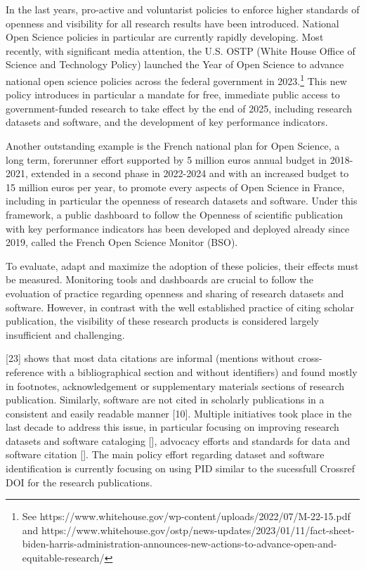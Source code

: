 \documentclass[
]{article}
\begin{document}
In the last years, pro-active and voluntarist policies to enforce higher
standards of openness and visibility for all research results have been
introduced. National Open Science policies in particular are currently
rapidly developing. Most recently, with significant media attention, the
U.S. OSTP (White House Office of Science and Technology Policy) launched
the Year of Open Science to advance national open science policies
across the federal government in 2023.\footnote{See
  https://www.whitehouse.gov/wp-content/uploads/2022/07/M-22-15.pdf and
  https://www.whitehouse.gov/ostp/news-updates/2023/01/11/fact-sheet-biden-harris-administration-announces-new-actions-to-advance-open-and-equitable-research/}
This new policy introduces in particular a mandate for free, immediate
public access to government-funded research to take effect by the end of
2025, including research datasets and software, and the development of
key performance indicators.

Another outstanding example is the French national plan for Open
Science, a long term, forerunner effort supported by 5 million euros
annual budget in 2018-2021, extended in a second phase in 2022-2024 and
with an increased budget to 15 million euros per year, to promote every
aspects of Open Science in France, including in particular the openness
of research datasets and software. Under this framework, a public
dashboard to follow the Openness of scientific publication with key
performance indicators has been developed and deployed already since
2019, called the French Open Science Monitor (BSO).

To evaluate, adapt and maximize the adoption of these policies, their
effects must be measured. Monitoring tools and dashboards are crucial to
follow the evoluation of practice regarding openness and sharing of
research datasets and software. However, in contrast with the well
established practice of citing scholar publication, the visibility of
these research products is considered largely insufficient and
challenging.

{[}23{]} shows that most data citations are informal (mentions without
cross-reference with a bibliographical section and without identifiers)
and found mostly in footnotes, acknowledgement or supplementary
materials sections of research publication. Similarly, software are not
cited in scholarly publications in a consistent and easily readable
manner {[}10{]}. Multiple initiatives took place in the last decade to
address this issue, in particular focusing on improving research
datasets and software cataloging {[}{]}, advocacy efforts and standards
for data and software citation {[}{]}. The main policy effort regarding
dataset and software identification is currently focusing on using PID
similar to the sucessfull Crossref DOI for the research publications.
\end{document}
